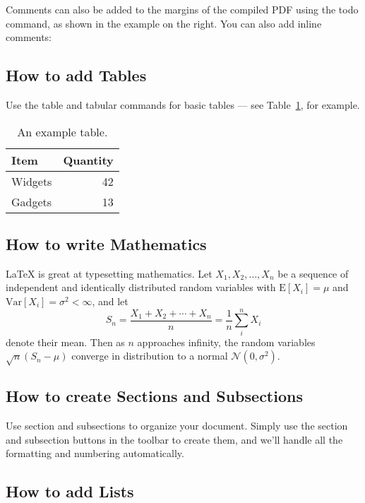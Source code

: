 \documentclass[a4paper]{article}
\begin{document}
Comments can also be added to the margins of the compiled PDF using the todo command, as shown in the example on the right. You can also add inline comments:


\subsection{How to add Tables}

Use the table and tabular commands for basic tables --- see Table~\ref{tab:widgets}, for example. 

\begin{table}
\centering
\begin{tabular}{l|r}
Item & Quantity \\\hline
Widgets & 42 \\
Gadgets & 13
\end{tabular}
\caption{\label{tab:widgets}An example table.}
\end{table}

\subsection{How to write Mathematics}

\LaTeX{} is great at typesetting mathematics. Let $X_1, X_2, \ldots, X_n$ be a sequence of independent and identically distributed random variables with $\text{E}[X_i] = \mu$ and $\text{Var}[X_i] = \sigma^2 < \infty$, and let
\[S_n = \frac{X_1 + X_2 + \cdots + X_n}{n}
      = \frac{1}{n}\sum_{i}^{n} X_i\]
denote their mean. Then as $n$ approaches infinity, the random variables $\sqrt{n}(S_n - \mu)$ converge in distribution to a normal $\mathcal{N}(0, \sigma^2)$.


\subsection{How to create Sections and Subsections}

Use section and subsections to organize your document. Simply use the section and subsection buttons in the toolbar to create them, and we'll handle all the formatting and numbering automatically.

\subsection{How to add Lists}
\end{document}
